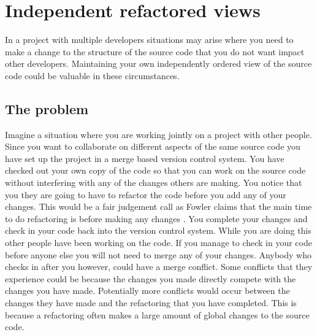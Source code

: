 
\chapter{Independent refactored views}

In a project with multiple developers situations may arise where you need to make a change to the structure of the source code that you do not want impact other developers.  Maintaining your own independently ordered view of the source code could be valuable in these circumstances. 

\section{The problem}


% 
% 

Imagine a situation where you are working jointly on a project with other people. Since you want to collaborate on different aspects of the same source code you have set up the project in a merge based version control system.  You have checked out your own copy of the code so that you can work on the source code without interfering with any of the changes others are making. You notice that you they are going to have to refactor the code before you add any of your changes.  This would be a fair judgement call as Fowler claims that the main time to do refactoring is before making any changes \cite{Fowler1999}. You complete your changes and check in your code back into the version control system.  While you are doing this other people have been working on the code.  If you manage to check in your code before anyone else you will not need to merge any of your changes.  Anybody who checks in after you however, could have a merge conflict.  Some conflicts that they experience could be because the changes you made directly compete with the changes you have made. Potentially more conflicts would occur between the changes they have made and the refactoring that you have completed. This is because a refactoring often makes a large amount of global changes to the source code.

